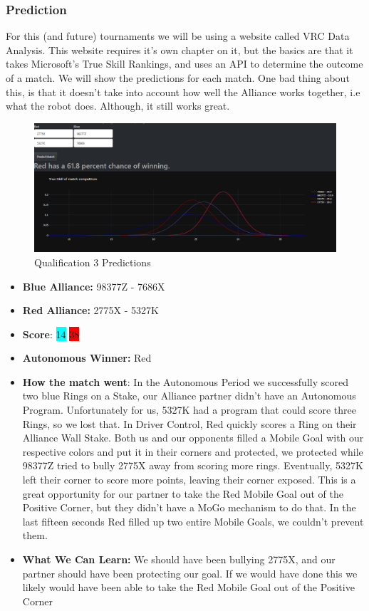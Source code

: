 \subsubsection*{Prediction}
For this (and future) tournaments we will be using a website called VRC Data Analysis. This website requires it's own chapter on it, but the basics are that it takes Microsoft's True Skill Rankings, and uses an API to determine the outcome of a match. We will show the predictions for each match. One bad thing about this, is that it doesn't take into account how well the Alliance works together, i.e what the robot does. Although, it still works great.
\begin{figure}[H]
    \centering
    \includegraphics[width=0.8\linewidth]{images/Q3ND.png}
    \caption{Qualification 3 Predictions}
    \label{fig:Qual-3-ND}
\end{figure}
\begin{itemize}
    \item \textbf{Blue Alliance:} 98377Z - 7686X
    \item \textbf{Red Alliance:} 2775X - 5327K
    \item \textbf{Score}: \colorbox{cyan}{14}
    \colorbox{red}{38}
    \item \textbf{Autonomous Winner:} Red
    \item \textbf{How the match went}: In the Autonomous Period we successfully scored two blue Rings on a Stake, our Alliance partner didn't have an Autonomous Program. Unfortunately for us, 5327K had a program that could score three Rings, so we lost that. In Driver Control, Red quickly scores a Ring on their Alliance Wall Stake. Both us and our opponents filled a Mobile Goal with our respective colors and put it in their corners and protected, we protected while 98377Z tried to bully 2775X away from scoring more rings. Eventually, 5327K left their corner to score more points, leaving their corner exposed. This is a great opportunity for our partner to take the Red Mobile Goal out of the Positive Corner, but they didn't have a MoGo mechanism to do that. In the last fifteen seconds Red filled up two entire Mobile Goals, we couldn't prevent them.
    \item \textbf{What We Can Learn:} We should have been bullying 2775X, and our partner should have been protecting our goal. If we would have done this we likely would have been able to take the Red Mobile Goal out of the Positive Corner
\end{itemize}

